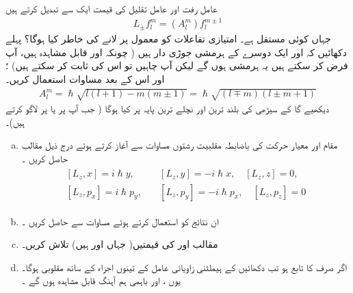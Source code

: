 عامل رفت اور عامل تقلیل  کی قیمت ایک  سے تبدیل کرتے ہیں 
\begin{align}
L_{\pm} f_l^m = (A_l^m) f_l^{m \pm 1}
\end{align}
جہاں  کوئی مستقل ہے۔  امتیازی تفاعلات کو معمول پر لانے کی خاطر  کیا ہوگا؟   پہلے دکھائیں کہ  اور  ایک دوسرے کے ہرمشی جوڑی دار ہیں ( چونکہ  اور  قابل مشاہدہ  ہیں،  آپ فرض کر سکتے ہیں یہ ہرمشی ہوں گے لیکن آپ چاہیں تو اس کی ثابت کر سکتے ہیں) ؛ اور   اس کے بعد مساوات    استعمال کریں۔  
\begin{align}\label{مساوات_تین_ابعادی_اے_ایل_ایم}
A_l^m = \hslash \sqrt{l (l +1) - m (m \pm 1)} = \hslash \sqrt{(l \mp m)(l \pm m + 1)} 
\end{align}
دیکھیے گا کے سیڑھی کی بلند ترین اور نچلے ترین پایہ پر کیا ہوگا ( جب آپ  پر  یا  پر  لاگو کرتے ہیں)۔ 
\begin{enumerate}[a.]
\item
مقام اور معیار حرکت کی باضابطہ  مقلبیت رشتوں   مساوات    سے آغاز  کرتے ہوئے درج ذیل مقالب  حاصل کریں ۔
\begin{gather}
\begin{aligned}
[L_z , x] = i \hslash y, & \quad [L_z , y] = - i \hslash x, \quad  [L_z , z] = 0, \\
 [L_z , p_x] = i \hslash p_y ,   &\quad [L_z , p_y] = - i \hslash p_x , \quad [L_z , p_z] = 0
\end{aligned}
\end{gather}
\item
ان نتائج کو استعمال کرتے ہوئے مساوات    سے   حاصل کریں ۔
\item
مقالب   اور  کی قیمتیں( جہاں  اور  ہیں)  تلاش کریں۔
\item
اگر  صرف  کا تابع ہو تب دکھائیں کے ہیملٹنی  زاویائی عامل   کے  تینوں اجزاء کے ساتھ مقلوبی  ہوگا۔ یوں ،   اور  باہمی ہم آہنگ  قابل مشاہدہ  ہوں گے ۔
\end{enumerate}
